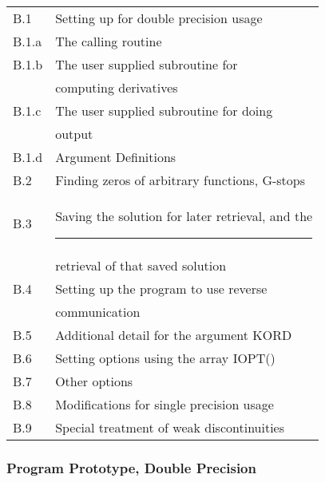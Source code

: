 \documentclass[twoside]{MATH77}
\begin{document}
\begin{tabular*}{3.3in}{@{}l@{~~}l}
B.1 & \hspace{-20pt} Setting up for double precision usage\dotfill
\pageref{PPDP}\\
\quad B.1.a & The calling routine\dotfill \pageref{Calling}\\
\quad B.1.b & The user supplied subroutine for\\
 & computing derivatives\dotfill \pageref{DIVAF}\\
\quad B.1.c & The user supplied subroutine for doing\\
 & output\dotfill \pageref{DIVAO}\\
\quad B.1.d & Argument Definitions\dotfill \pageref{ArgDefs}\\
B.2 & \hspace{-20pt} Finding zeros of arbitrary functions, G-stops\dotfill
\pageref{GStops}\\
B.3 & \hspace{-20pt} Saving the solution for later retrieval, and
the\rule{.25in}{0pt}\\
 & \hspace{-20pt} retrieval of that saved solution\dotfill \pageref{SavSol}\\
B.4 & \hspace{-20pt} Setting up the program to use reverse\\
& \hspace{-20pt} communication\dotfill \pageref{RevCom}\\
B.5 & \hspace{-20pt} Additional detail for the argument KORD\dotfill
\pageref{KORD}\\
B.6 & \hspace{-20pt} Setting options using the array IOPT()\dotfill
\pageref{IOPT}\\
B.7 & \hspace{-20pt} Other options\dotfill \pageref{OtherOpt}\\
B.8 & \hspace{-20pt} Modifications for single precision usage\dotfill
\pageref{Sngl}\\
B.9 & \hspace{-20pt} Special treatment of weak discontinuities\dotfill
\pageref{Discon}
\end{tabular*}

\subsubsection{Program Prototype, Double Precision\label{PPDP}}
\end{document}
